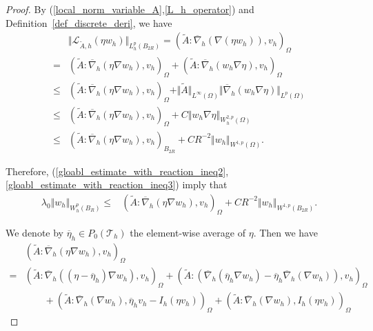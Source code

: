 \documentclass[12pt]{amsart}
\theoremstyle{definition}
\theoremstyle{remark}
\begin{document}
\begin{proof}
By (\ref{local_norm_variable_A},\ref{L_h_operator}) and Definition~\ref{def_discrete_deri}, we have 
\begin{align}
\label{gloabl_estimate_with_reaction_ineq3}
& \Vert \mathcal{L}_{\tilde{A},h}(\eta w_{h}) \Vert_{L_{h}^{p}(B_{2R})} 
= (\tilde{A}:\overline{\nabla}_{h}(\nabla (\eta w_{h})), v_{h})_{\Omega} \\ 
\nonumber 
= & (\tilde{A}:\overline{\nabla}_{h}(\eta \nabla  w_{h}), v_{h})_{\Omega} 
+ (\tilde{A}:\overline{\nabla}_{h}(w_{h}\nabla \eta ), v_{h})_{\Omega}\\ 
\nonumber 
\leq & (\tilde{A}:\overline{\nabla}_{h}(\eta \nabla  w_{h}), v_{h})_{\Omega} 
+ \Vert \tilde{A}\Vert_{L^{\infty}(\Omega)} 
\Vert \overline{\nabla}_{h}(w_{h}\nabla \eta )\Vert_{L^{p}(\Omega)} \\ 
\nonumber
\leq & (\tilde{A}:\overline{\nabla}_{h}(\eta \nabla  w_{h}), v_{h})_{\Omega} 
+ C \Vert w_{h}\nabla \eta\Vert_{W_{h}^{2,p}(\Omega)} \\ 
\nonumber 
\leq & (\tilde{A}:\overline{\nabla}_{h}(\eta \nabla  w_{h}), v_{h})_{B_{2R}} 
+ C R^{-2}\Vert w_{h}\Vert_{W^{1,p}(\Omega)}.
\end{align}

Therefore, (\ref{gloabl_estimate_with_reaction_ineq2},\ref{gloabl_estimate_with_reaction_ineq3}) imply that 
\begin{align}
\label{gloabl_estimate_with_reaction_ineq4}
\lambda_{0}\Vert w_{h} \Vert_{W_{h}^{p}(B_{R})} 
\leq & (\tilde{A}:\overline{\nabla}_{h}(\eta \nabla  w_{h}), v_{h})_{\Omega} 
+ C R^{-2}\Vert w_{h}\Vert_{W^{1,p}(B_{2R})}.
\end{align}

We denote by $\overline{\eta}_{h} \in P_{0}(\mathcal{T}_{h})$ the element-wise average of $\eta$.
Then we have 
\begin{align}
\label{gloabl_estimate_with_reaction_ineq5}
& (\tilde{A}:\overline{\nabla}_{h}(\eta \nabla  w_{h}), v_{h})_{\Omega} \\
\nonumber
= & (\tilde{A}:\overline{\nabla}_{h}( (\eta - \overline{\eta}_{h} ) \nabla  w_{h}), v_{h})_{\Omega} 
+ (\tilde{A}:\left(\overline{\nabla}_{h}( \overline{\eta}_{h}  \nabla  w_{h}) 
- \overline{\eta}_{h}\overline{\nabla}_{h}( \nabla  w_{h})\right), v_{h})_{\Omega} \\ 
\nonumber
& \qquad + (\tilde{A}:\overline{\nabla}_{h}( \nabla  w_{h}), \overline{\eta}_{h} v_{h} - I_{h}(\eta v_{h}))_{\Omega}
+ (\tilde{A}:\overline{\nabla}_{h}( \nabla  w_{h}), I_{h}(\eta v_{h}))_{\Omega}
\end{align} 
 

\end{proof}
\end{document}

